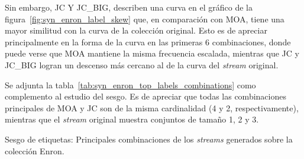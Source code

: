 Sin embargo, JC Y JC\_BIG, describen una curva en el gráfico de la
figura~\ref{fig:syn_enron_label_skew} que, en comparación con MOA, tiene una
mayor similitud con la curva de la colección original. Esto es de apreciar
principalmente en la forma de la curva en las primeras 6 combinaciones, donde
puede verse que MOA mantiene la misma frecuencia escalada, mientras que JC y
JC\_BIG logran un descenso más cercano al de la curva del \textit{stream}
original.

Se adjunta la tabla~\ref{tab:syn_enron_top_labels_combinations} como
complemento al estudio del sesgo. Es de apreciar que todas las combinaciones
principales de MOA y JC son de la misma cardinalidad (4 y 2, respectivamente),
mientras que el \textit{stream} original muestra conjuntos de tamaño 1, 2 y 3.

\begin{table}
	\centering
	\begin{adjustbox}{max width=\textwidth}
		
	\end{adjustbox}
	\caption{Sesgo de etiquetas: Principales combinaciones de los
		\textit{streams} generados sobre la colección Enron.}
	\label{tab:syn_enron_top_labels_combinations}
\end{table}
\bigskip

